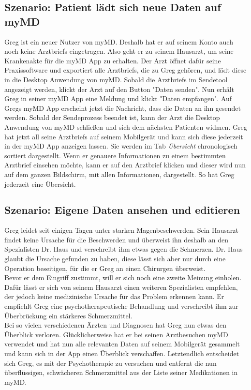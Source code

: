 \documentclass[a4paper]{scrreprt}
\begin{document}
\subsection{Szenario: Patient lädt sich neue Daten auf myMD}
Greg ist ein neuer \gls{Nutzer} von myMD. Deshalb hat er auf seinem Konto auch noch keine \glspl{Arztbrief} eingetragen. Also geht er zu seinem Hausarzt, um seine Krankenakte für die myMD \gls{App} zu erhalten. Der Arzt öffnet dafür seine Praxissoftware und exportiert alle \glspl{Arztbrief}, die zu Greg gehören, und lädt diese in die \gls{Desktop Anwendung} von myMD. Sobald die \glspl{Arztbrief} im Sendetool angezeigt werden, klickt der Arzt auf den Button "Daten senden". Nun erhält Greg in seiner myMD \gls{App} eine Meldung und klickt "Daten empfangen". Auf Gregs myMD \gls{App} erscheint jetzt die Nachricht, dass die Daten an ihn gesendet werden. Sobald der Sendeprozess beendet ist, kann der Arzt die \gls{Desktop Anwendung} von myMD schließen und sich dem nächsten Patienten widmen. Greg hat jetzt all seine \glspl{Arztbrief} auf seinem Mobilgerät und kann sich diese jederzeit in der myMD \gls{App} anzeigen lassen. Sie werden im \gls{Tab} \textit{Übersicht} chronologisch sortiert dargestellt. Wenn er genauere Informationen zu einem bestimmten \gls{Arztbrief} einsehen möchte, kann er auf den \gls{Arztbrief} klicken und dieser wird nun auf dem ganzen Bildschirm, mit allen Informationen, dargestellt. So hat Greg jederzeit eine Übersicht.

\subsection{Szenario: Eigene Daten ansehen und editieren}
Greg leidet seit einigen Tagen unter starken Magenbeschwerden. Sein Hausarzt findet keine Ursache für die Beschwerden und überweist ihn deshalb an den Spezialisten Dr. Haus und verschreibt ihm etwas gegen die Schmerzen. Dr. Haus glaubt die Ursache gefunden zu haben, diese lässt sich aber nur durch eine Operation beseitigen, für die er Greg an einen Chirurgen überweist. \\
Bevor er dem Eingriff zustimmt, will er sich noch eine zweite Meinung einholen. Dafür lässt er sich von seinem Hausarzt einen weiteren Spezialisten empfehlen, der jedoch keine medizinische Ursache für das Problem erkennen kann. Er empfiehlt Greg eine psychotherapeutische Behandlung und verschreibt ihm zur Überbrückung ein stärkeres Schmerzmittel. \\ 
Bei so vielen verschiedenen Ärzten und Diagnosen hat Greg nun etwas den Überblick verloren. Glücklicherweise hat er bei seinen Arztbesuchen myMD verwendet und hat nun alle relevanten Daten auf seinem Mobilgerät gesammelt und kann sich in der App einen Überblick verschaffen. Letztendlich entscheidet sich Greg, es mit der Psychotherapie zu versuchen und entfernt die nun überflüssigen, schwächeren Schmerzmittel aus der Liste seiner Medikationen in myMD. 
\end{document}
